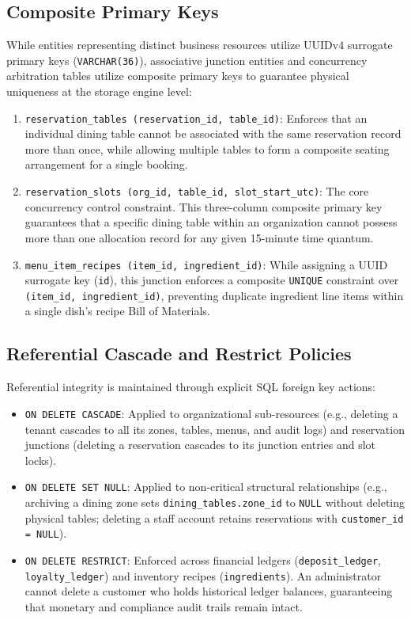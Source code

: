 \subsection{Composite Primary Keys}
While entities representing distinct business resources utilize UUIDv4 surrogate primary keys (\texttt{VARCHAR(36)}), associative junction entities and concurrency arbitration tables utilize composite primary keys to guarantee physical uniqueness at the storage engine level:
\begin{enumerate}
    \item \texttt{reservation\_tables (reservation\_id, table\_id)}: Enforces that an individual dining table cannot be associated with the same reservation record more than once, while allowing multiple tables to form a composite seating arrangement for a single booking.
    \item \texttt{reservation\_slots (org\_id, table\_id, slot\_start\_utc)}: The core concurrency control constraint. This three-column composite primary key guarantees that a specific dining table within an organization cannot possess more than one allocation record for any given 15-minute time quantum.
    \item \texttt{menu\_item\_recipes (item\_id, ingredient\_id)}: While assigning a UUID surrogate key (\texttt{id}), this junction enforces a composite \texttt{UNIQUE} constraint over \texttt{(item\_id, ingredient\_id)}, preventing duplicate ingredient line items within a single dish's recipe Bill of Materials.
\end{enumerate}

\subsection{Referential Cascade and Restrict Policies}
Referential integrity is maintained through explicit SQL foreign key actions:
\begin{itemize}
    \item \texttt{ON DELETE CASCADE}: Applied to organizational sub-resources (e.g., deleting a tenant cascades to all its zones, tables, menus, and audit logs) and reservation junctions (deleting a reservation cascades to its junction entries and slot locks).
    \item \texttt{ON DELETE SET NULL}: Applied to non-critical structural relationships (e.g., archiving a dining zone sets \texttt{dining\_tables.zone\_id} to \texttt{NULL} without deleting physical tables; deleting a staff account retains reservations with \texttt{customer\_id = NULL}).
    \item \texttt{ON DELETE RESTRICT}: Enforced across financial ledgers (\texttt{deposit\_ledger}, \texttt{loyalty\_ledger}) and inventory recipes (\texttt{ingredients}). An administrator cannot delete a customer who holds historical ledger balances, guaranteeing that monetary and compliance audit trails remain intact.
\end{itemize}
